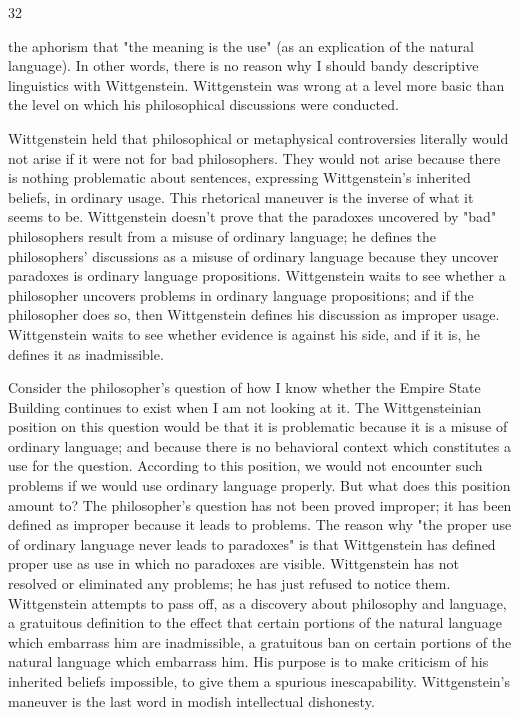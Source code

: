 \documentclass[10pt,twoside]{memoir}
\begin{document}
\begin{enumerate}
{{{{{32 


the aphorism that "the meaning is the use" (as an explication of the natural 
language). In other words, there is no reason why I should bandy descriptive 
linguistics with Wittgenstein. Wittgenstein was wrong at a level more basic 
than the level on which his philosophical discussions were conducted. 

Wittgenstein held that philosophical or metaphysical controversies 
literally would not arise if it were not for bad philosophers. They would not 
arise because there is nothing problematic about sentences, expressing 
Wittgenstein's inherited beliefs, in ordinary usage. This rhetorical maneuver 
is the inverse of what it seems to be. Wittgenstein doesn't prove that the 
paradoxes uncovered by "bad" philosophers result from a misuse of ordinary 
language; he defines the philosophers' discussions as a misuse of ordinary 
language because they uncover paradoxes is ordinary language propositions. 
Wittgenstein waits to see whether a philosopher uncovers problems in 
ordinary language propositions; and if the philosopher does so, then 
Wittgenstein defines his discussion as improper usage. Wittgenstein waits to 
see whether evidence is against his side, and if it is, he defines it as 
inadmissible. 

Consider the philosopher's question of how I know whether the Empire 
State Building continues to exist when I am not looking at it. The 
Wittgensteinian position on this question would be that it is problematic 
because it is a misuse of ordinary language; and because there is no 
behavioral context which constitutes a use for the question. According to 
this position, we would not encounter such problems if we would use 
ordinary language properly. But what does this position amount to? The 
philosopher's question has not been proved improper; it has been defined as 
improper because it leads to problems. The reason why "the proper use of 
ordinary language never leads to paradoxes" is that Wittgenstein has defined 
proper use as use in which no paradoxes are visible. Wittgenstein has not 
resolved or eliminated any problems; he has just refused to notice them. 
Wittgenstein attempts to pass off, as a discovery about philosophy and 
language, a gratuitous definition to the effect that certain portions of the 
natural language which embarrass him are inadmissible, a gratuitous ban on 
certain portions of the natural language which embarrass him. His purpose is 
to make criticism of his inherited beliefs impossible, to give them a spurious 
inescapability. Wittgenstein's maneuver is the last word in modish 
intellectual dishonesty. 


}}}}}
\end{enumerate}
\end{document}

